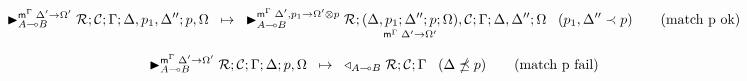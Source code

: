 
\begin{align}
\trans{\matstate{A \lolli B}{\rulestk}{\lstack{C}}{\Gamma}{\Delta, p_1, \Delta''}{p,
   \Omega}{\Delta' \rightarrow \Omega'}}
{\matstate{A \lolli B}{\rulestk}{\lframe{\Delta,
   p_1}{\Delta''}{p}{\Omega}{\Delta'}{\Omega'}, \lstack{C}}{\Gamma}{\Delta,
   \Delta''}{\Omega}{\Delta', p_1 \rightarrow \Omega' \otimes p}} \;\;\; (p_1, \Delta'' \prec p)
   \tag{match p ok}
\end{align}

\begin{align}
\trans{\matstate{A \lolli B}{\rulestk}{\lstack{C}}{\Gamma}{\Delta}{p,
   \Omega}{\Delta' \rightarrow \Omega'}}
{\contstate{A \lolli B}{\rulestk}{\lstack{C}}{\Gamma}} \;\;\; (\Delta \npreceq
      p) \tag{match p fail}
\end{align}
